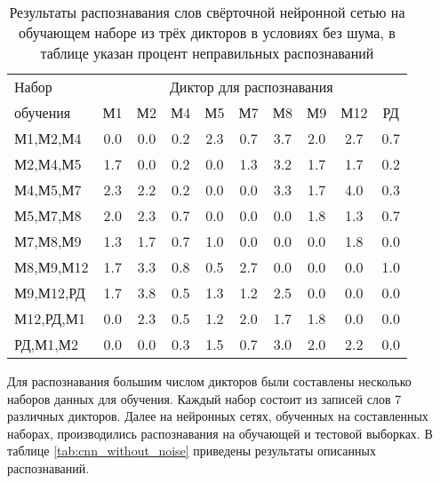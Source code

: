\begin{table}[h]
	\centering
	\caption{Результаты распознавания слов свёрточной нейронной сетью на обучающем наборе из трёх дикторов в условиях без шума, в таблице указан процент неправильных распознаваний}
	\label{tab:cnn_3dictor}
	\begin{tabular}{| l | c | c | c | c | c | c | c | c | c |}
		\hline
		Набор & \multicolumn{9}{c|}{Диктор для распознавания} \\
		\hhline{~---------}
		обучения  & \phantom{0}М1\phantom{0} & \phantom{0}М2\phantom{0} & \phantom{0}М4\phantom{0} & \phantom{0}М5\phantom{0} & \phantom{0}М7\phantom{0} & \phantom{0}М8\phantom{0} & \phantom{0}М9\phantom{0} & \phantom{0}М12\phantom{0} & \phantom{0}РД\phantom{0} \\
		\hline
		М1,М2,М4  & 0.0 & 0.0 & 0.2 & 2.3 & 0.7 & 3.7 & 2.0 & 2.7 & 0.7 \\
		М2,М4,М5  & 1.7 & 0.0 & 0.2 & 0.0 & 1.3 & 3.2 & 1.7 & 1.7 & 0.2 \\
		М4,М5,М7  & 2.3 & 2.2 & 0.2 & 0.0 & 0.0 & 3.3 & 1.7 & 4.0 & 0.3 \\
		М5,М7,М8  & 2.0 & 2.3 & 0.7 & 0.0 & 0.0 & 0.0 & 1.8 & 1.3 & 0.7 \\
		М7,М8,М9  & 1.3 & 1.7 & 0.7 & 1.0 & 0.0 & 0.0 & 0.0 & 1.8 & 0.0 \\
		М8,М9,М12 & 1.7 & 3.3 & 0.8 & 0.5 & 2.7 & 0.0 & 0.0 & 0.0 & 1.0 \\
		М9,М12,РД & 1.7 & 3.8 & 0.5 & 1.3 & 1.2 & 2.5 & 0.0 & 0.0 & 0.0 \\
		М12,РД,М1 & 0.0 & 2.3 & 0.5 & 1.2 & 2.0 & 1.7 & 1.8 & 0.0 & 0.0 \\
		РД,М1,М2  & 0.0 & 0.0 & 0.3 & 1.5 & 0.7 & 3.0 & 2.0 & 2.2 & 0.0 \\
		\hline
	\end{tabular}
\end{table}

Для распознавания большим числом дикторов были составлены несколько наборов данных для обучения.
Каждый набор состоит из записей слов 7 различных дикторов.
Далее на нейронных сетях, обученных на составленных наборах, производились распознавания на обучающей и тестовой выборках.
В таблице \ref{tab:cnn_without_noise} приведены результаты описанных распознаваний.

